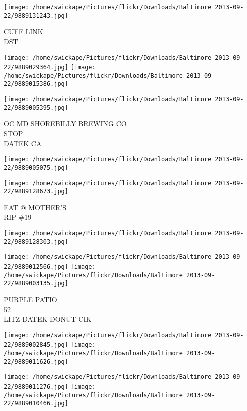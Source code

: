 \documentclass[10pt,letterpaper]{article}
\begin{document}
\vspace{0.25in}
\texttt{[image: /home/swickape/Pictures/flickr/Downloads/Baltimore 2013-09-22/9889131243.jpg]}

CUFF LINK\\
DST
\pagebreak

\texttt{[image: /home/swickape/Pictures/flickr/Downloads/Baltimore 2013-09-22/9889029364.jpg]}
\texttt{[image: /home/swickape/Pictures/flickr/Downloads/Baltimore 2013-09-22/9889015386.jpg]}

\vspace{0.25in}
\texttt{[image: /home/swickape/Pictures/flickr/Downloads/Baltimore 2013-09-22/9889005395.jpg]}

OC MD SHOREBILLY BREWING CO\\
STOP\\
DATEK CA
\pagebreak

\texttt{[image: /home/swickape/Pictures/flickr/Downloads/Baltimore 2013-09-22/9889005075.jpg]}

\vspace{0.25in}
\texttt{[image: /home/swickape/Pictures/flickr/Downloads/Baltimore 2013-09-22/9889128673.jpg]}

EAT @ MOTHER'S\\
RIP \#19
\pagebreak

\texttt{[image: /home/swickape/Pictures/flickr/Downloads/Baltimore 2013-09-22/9889128303.jpg]}

\vspace{0.25in}
\texttt{[image: /home/swickape/Pictures/flickr/Downloads/Baltimore 2013-09-22/9889012566.jpg]}
\texttt{[image: /home/swickape/Pictures/flickr/Downloads/Baltimore 2013-09-22/9889003135.jpg]}

PURPLE PATIO\\
52\\
LITZ DATEK DONUT CIK
\pagebreak

\texttt{[image: /home/swickape/Pictures/flickr/Downloads/Baltimore 2013-09-22/9889002845.jpg]}
\texttt{[image: /home/swickape/Pictures/flickr/Downloads/Baltimore 2013-09-22/9889011626.jpg]}

\texttt{[image: /home/swickape/Pictures/flickr/Downloads/Baltimore 2013-09-22/9889011276.jpg]}
\texttt{[image: /home/swickape/Pictures/flickr/Downloads/Baltimore 2013-09-22/9889010466.jpg]}
\end{document}
